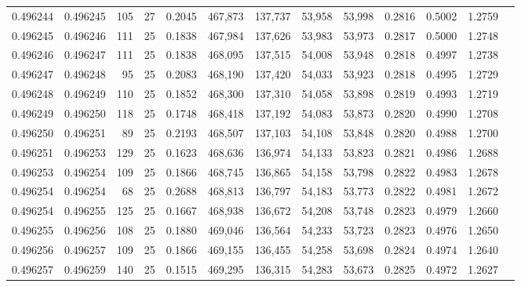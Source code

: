 \begin{tabular}{rrrrrrrrrrrrr}
0.496244 & 0.496245 &   105 &  27 &                                     0.2045 & 467,873 & 137,737 &  53,958 &  53,998 & 0.2816 & 0.5002 & 1.2759 \\
0.496245 & 0.496246 &   111 &  25 &                                     0.1838 & 467,984 & 137,626 &  53,983 &  53,973 & 0.2817 & 0.5000 & 1.2748 \\
0.496246 & 0.496247 &   111 &  25 &                                     0.1838 & 468,095 & 137,515 &  54,008 &  53,948 & 0.2818 & 0.4997 & 1.2738 \\
0.496247 & 0.496248 &    95 &  25 &                                     0.2083 & 468,190 & 137,420 &  54,033 &  53,923 & 0.2818 & 0.4995 & 1.2729 \\
0.496248 & 0.496249 &   110 &  25 &                                     0.1852 & 468,300 & 137,310 &  54,058 &  53,898 & 0.2819 & 0.4993 & 1.2719 \\
0.496249 & 0.496250 &   118 &  25 &                                     0.1748 & 468,418 & 137,192 &  54,083 &  53,873 & 0.2820 & 0.4990 & 1.2708 \\
0.496250 & 0.496251 &    89 &  25 &                                     0.2193 & 468,507 & 137,103 &  54,108 &  53,848 & 0.2820 & 0.4988 & 1.2700 \\
0.496251 & 0.496253 &   129 &  25 &                                     0.1623 & 468,636 & 136,974 &  54,133 &  53,823 & 0.2821 & 0.4986 & 1.2688 \\
0.496253 & 0.496254 &   109 &  25 &                                     0.1866 & 468,745 & 136,865 &  54,158 &  53,798 & 0.2822 & 0.4983 & 1.2678 \\
0.496254 & 0.496254 &    68 &  25 &                                     0.2688 & 468,813 & 136,797 &  54,183 &  53,773 & 0.2822 & 0.4981 & 1.2672 \\
0.496254 & 0.496255 &   125 &  25 &                                     0.1667 & 468,938 & 136,672 &  54,208 &  53,748 & 0.2823 & 0.4979 & 1.2660 \\
0.496255 & 0.496256 &   108 &  25 &                                     0.1880 & 469,046 & 136,564 &  54,233 &  53,723 & 0.2823 & 0.4976 & 1.2650 \\
0.496256 & 0.496257 &   109 &  25 &                                     0.1866 & 469,155 & 136,455 &  54,258 &  53,698 & 0.2824 & 0.4974 & 1.2640 \\
0.496257 & 0.496259 &   140 &  25 &                                     0.1515 & 469,295 & 136,315 &  54,283 &  53,673 & 0.2825 & 0.4972 & 1.2627 \\

\end{tabular}
